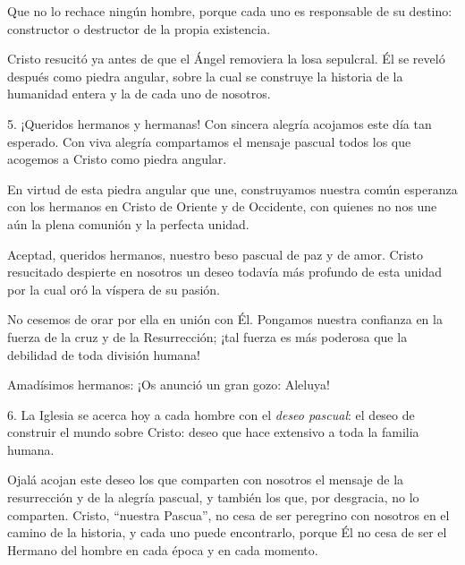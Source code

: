 			\begin{body}Que no lo rechace ningún hombre, porque cada uno es responsable de su destino: constructor o destructor de la propia existencia.\end{body}
			
			\begin{body}Cristo resucitó ya antes de que el Ángel removiera la losa sepulcral. Él se reveló después como piedra angular, sobre la cual se construye la historia de la humanidad entera y la de cada uno de nosotros.\end{body}
			
			\begin{body}5. ¡Queridos hermanos y hermanas! Con sincera alegría acojamos este día tan esperado. Con viva alegría compartamos el mensaje pascual todos los que acogemos a Cristo como piedra angular.\end{body}
			
			\begin{body}En virtud de esta piedra angular que une, construyamos nuestra común esperanza con los hermanos en Cristo de Oriente y de Occidente, con quienes no nos une aún la plena comunión y la perfecta unidad.\end{body}
			
			\begin{body}Aceptad, queridos hermanos, nuestro beso pascual de paz y de amor. Cristo resucitado despierte en nosotros un deseo todavía más profundo de esta unidad por la cual oró la víspera de su pasión.\end{body}
			
			\begin{body}No cesemos de orar por ella en unión con Él. Pongamos nuestra confianza en la fuerza de la cruz y de la Resurrección; ¡tal fuerza es más poderosa que la debilidad de toda división humana!\end{body}
			
			\begin{body}Amadísimos hermanos: ¡Os anunció un gran gozo: Aleluya!\end{body}
			
			\begin{body}6. La Iglesia se acerca hoy a cada hombre con el \textit{deseo pascual}: el deseo de construir el mundo sobre Cristo: deseo que hace extensivo a toda la familia humana.\end{body}
			
			\begin{body}Ojalá acojan este deseo los que comparten con nosotros el mensaje de la resurrección y de la alegría pascual, y también los que, por desgracia, no lo comparten. Cristo, “nuestra Pascua”, no cesa de ser peregrino con nosotros en el camino de la historia, y cada uno puede encontrarlo, porque Él no cesa de ser el Hermano del hombre en cada época y en cada momento.\end{body}
			
